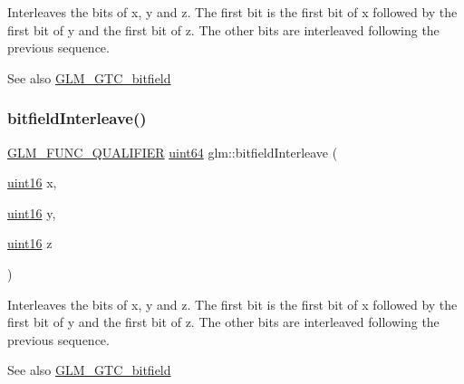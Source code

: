 Interleaves the bits of x, y and z. The first bit is the first bit of x followed by the first bit of y and the first bit of z. The other bits are interleaved following the previous sequence.

\begin{DoxySeeAlso}{See also}
\mbox{\hyperlink{group__gtc__bitfield}{G\+L\+M\+\_\+\+G\+T\+C\+\_\+bitfield}} 
\end{DoxySeeAlso}
\mbox{\label{group__gtc__bitfield_ga3c170e2ec54f2faab5e1c5bb693d718d}} 
\subsubsection{\texorpdfstring{bitfield\+Interleave()}{bitfieldInterleave()}\hspace{0.1cm}{\footnotesize\ttfamily [10/16]}}
{\footnotesize\ttfamily \mbox{\hyperlink{setup_8hpp_a33fdea6f91c5f834105f7415e2a64407}{G\+L\+M\+\_\+\+F\+U\+N\+C\+\_\+\+Q\+U\+A\+L\+I\+F\+I\+ER}} \mbox{\hyperlink{group__gtc__type__precision_gae3632bf9b37da66233d78930dd06378a}{uint64}} glm\+::bitfield\+Interleave (\begin{DoxyParamCaption}\item[{\mbox{\hyperlink{group__gtc__type__precision_gad8c2939e1fdd8e5828b31d95c52255d5}{uint16}}}]{x,  }\item[{\mbox{\hyperlink{group__gtc__type__precision_gad8c2939e1fdd8e5828b31d95c52255d5}{uint16}}}]{y,  }\item[{\mbox{\hyperlink{group__gtc__type__precision_gad8c2939e1fdd8e5828b31d95c52255d5}{uint16}}}]{z }\end{DoxyParamCaption})}

Interleaves the bits of x, y and z. The first bit is the first bit of x followed by the first bit of y and the first bit of z. The other bits are interleaved following the previous sequence.

\begin{DoxySeeAlso}{See also}
\mbox{\hyperlink{group__gtc__bitfield}{G\+L\+M\+\_\+\+G\+T\+C\+\_\+bitfield}} 
\end{DoxySeeAlso}
\mbox{\label{group__gtc__bitfield_ga64e2d84f6560af3cc639644b1e628c42}} 
